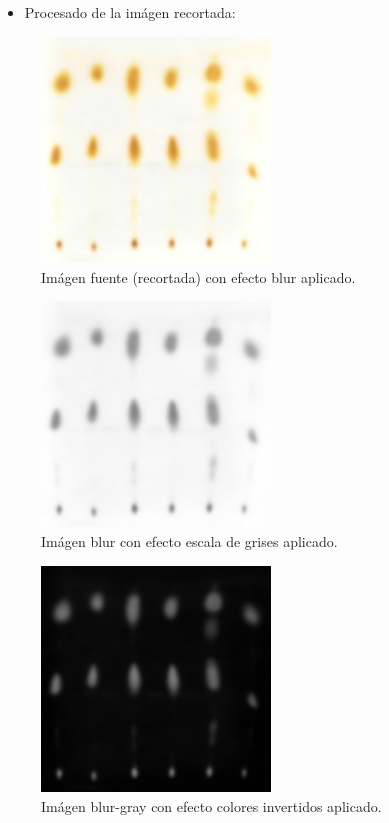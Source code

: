 \newpage
\begin{itemize}
	\item Procesado de la im\'agen recortada:
\end{itemize}

\begin{figure}[H]
	\vspace{-0.2cm}
	\centering
	\includegraphics[width=230px]{imagenes-jtlc/experimento/search-samples/1-blur}
	\centering
	\caption{Im\'agen fuente (recortada) con efecto blur aplicado.}
	\label{fig:font-c-blur}
	\vspace{-0.15cm}
\end{figure}
\begin{figure}[H]
	\vspace{-0.2cm}
	\centering
	\includegraphics[width=230px]{imagenes-jtlc/experimento/search-samples/2-gray}
	\centering
	\caption{Im\'agen blur con efecto escala de grises aplicado.}
	\label{fig:font-c-gray}
	\vspace{-0.15cm}
\end{figure}
\begin{figure}[H]
	\vspace{-0.2cm}
	\centering
	\includegraphics[width=230px]{imagenes-jtlc/experimento/search-samples/3-invert}
	\centering
	\caption{Im\'agen blur-gray con efecto colores invertidos aplicado.}
	\label{fig:font-c-invert}
	\vspace{-0.15cm}
\end{figure}
